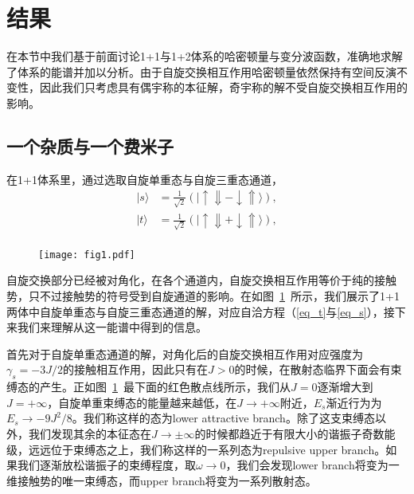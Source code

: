 \section{结果}\label{2sec:spex-result}
在本节中我们基于前面讨论1+1与1+2体系的哈密顿量与变分波函数，准确地求解了体系的能谱并加以分析。由于自旋交换相互作用哈密顿量依然保持有空间反演不变性，因此我们只考虑具有偶宇称的本征解，奇宇称的解不受自旋交换相互作用的影响。

\subsection{一个杂质与一个费米子}
在1+1体系里，通过选取自旋单重态与自旋三重态通道，
\begin{equation}
\begin{split}
    |s\rangle &= \frac{1}{\sqrt{2}}(|\uparrow\Downarrow - \downarrow\Uparrow\rangle),\\
    |t\rangle &= \frac{1}{\sqrt{2}}(|\uparrow\Downarrow + \downarrow\Uparrow\rangle),\\
\end{split}
\end{equation}

\begin{figure}[!htbp]
    \centering
    \texttt{[image: fig1.pdf]}
    \label{fig:fig1}
\end{figure}

自旋交换部分已经被对角化，在各个通道内，自旋交换相互作用等价于纯的接触势，只不过接触势的符号受到自旋通道的影响。在如图~\ref{fig:fig1}~所示，我们展示了1+1两体中自旋单重态与自旋三重态通道的解，对应自洽方程（\ref{eq_t}与\ref{eq_s}），接下来我们来理解从这一能谱中得到的信息。



首先对于自旋单重态通道的解，对角化后的自旋交换相互作用对应强度为$\gamma_s=-3J/2$的接触相互作用，因此只有在$J>0$的时候，在散射态临界下面会有束缚态的产生。正如图~\ref{fig:fig1}~最下面的红色散点线所示，我们从$J=0$逐渐增大到$J=+\infty$，自旋单重束缚态的能量越来越低，在$J\to + \infty$附近，$E_s$渐近行为为$E_s\rightarrow -9J^2/8$。我们称这样的态为lower attractive branch。除了这支束缚态以外，我们发现其余的本征态在$J\to \pm \infty$的时候都趋近于有限大小的谐振子奇数能级，远远位于束缚态之上，我们称这样的一系列态为repulsive upper branch。如果我们逐渐放松谐振子的束缚程度，取$\omega\to 0$，我们会发现lower branch将变为一维接触势的唯一束缚态，而upper branch将变为一系列散射态。

